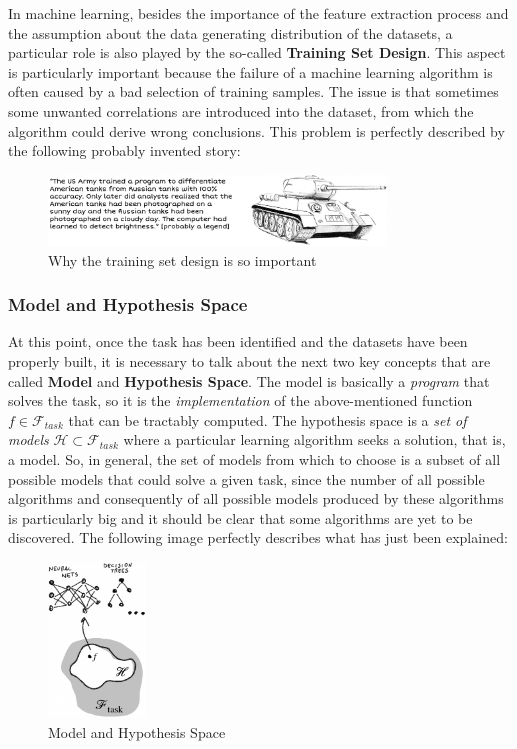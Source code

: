 \newpage

In machine learning, besides the importance of the feature extraction process and the assumption about
the data generating distribution of the datasets, a particular role is also played by the so-called
\textbf{Training Set Design}. This aspect is particularly important because the failure of a
machine learning algorithm is often caused by a bad selection of training samples. The issue is that
sometimes some unwanted correlations are introduced into the dataset, from which the algorithm could
derive wrong conclusions. This problem is perfectly described by the following probably invented
story:

\vspace{5mm}

\begin{figure}[h]
      \centering
      \includegraphics[width=0.8\textwidth]{../img/Train_Failure}
      \caption{Why the training set design is so important}
\end{figure}

\subsubsection{Model and Hypothesis Space}

At this point, once the task has been identified and the datasets have been properly built,
it is necessary to talk about the next two key concepts that are called \textbf{Model} and
\textbf{Hypothesis Space}. The model is basically a \emph{program} that solves the task, so
it is the \emph{implementation} of the above-mentioned function $f \in \mathcal{F}_{task}$
that can be tractably computed. The hypothesis space is a \emph{set of models}
$\mathcal{H} \subset \mathcal{F}_{task}$ where a particular learning algorithm seeks a
solution, that is, a model. So, in general, the set of models from which to choose is a
subset of all possible models that could solve a given task, since the number of all possible
algorithms and consequently of all possible models produced by these algorithms is
particularly big and it should be clear that some algorithms are yet to be discovered.
The following image perfectly describes what has just been explained:

\begin{figure}[h]
      \centering
      \includegraphics[width=0.23\textwidth]{../img/Model_and_hypothesis_space}
      \caption{Model and Hypothesis Space}
\end{figure}

